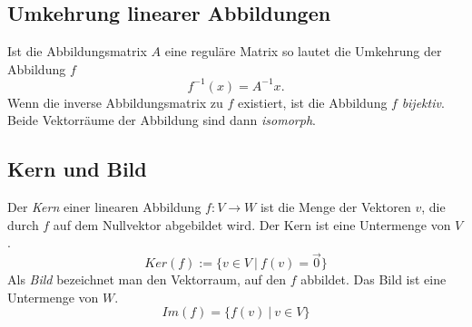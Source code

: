 \subsection{Umkehrung linearer Abbildungen}
\label{sub:umkehrung_linearer_abbildungen}

Ist die Abbildungsmatrix $A$ eine reguläre Matrix so lautet die Umkehrung der Abbildung $f$
\begin{equation}
	f^{-1}(x) = A^{-1}x.
\end{equation}
Wenn die inverse Abbildungsmatrix zu $f$ existiert, ist die Abbildung $f$ \emph{bijektiv}. Beide Vektorräume der 
Abbildung sind dann \emph{isomorph}.

\subsection{Kern und Bild} 
\label{sub:kern_und_bild}

Der \emph{Kern} einer linearen Abbildung $f : V \rightarrow W$ ist die Menge der Vektoren $v$, die durch $f$ auf dem 
Nullvektor abgebildet wird. Der Kern ist eine Untermenge von $V$.
\begin{equation}
	Ker(f) := \{v \in V \: | \: f(v) = \overrightarrow{0}\}
\end{equation}
Als \emph{Bild} bezeichnet man den Vektorraum, auf den $f$ abbildet. Das Bild ist eine Untermenge von $W$.
\begin{equation}
	Im(f) = \{ f(v) \: | \: v \in V \}
\end{equation}



